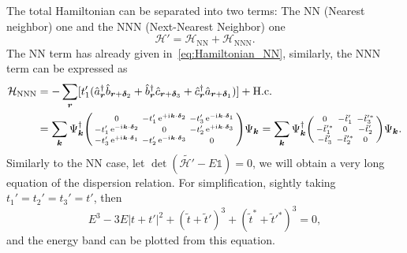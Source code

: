\documentclass[ preprint, numerical, superscriptaddress, svgnames,
                amssymb, aps, prb ]{revtex4-2}
\DeclareRobustCommand \iu {\mathrm i\mkern1mu}
\DeclareMathOperator \upe {e}
\renewcommand *\theequation{\arabic{section}.\arabic{equation}}
\begin{document}
The total Hamiltonian can be separated into two terms: The NN
(Nearest neighbor) one and the NNN (Next-Nearest Neighbor) one
\begin{equation}
  \mathcal H' = \mathcal H_\text{NN} + \mathcal H_\text{NNN}.
\end{equation}
The NN term has already given in~\eqref{eq:Hamiltonian_NN},
similarly, the NNN term can be expressed as~\cite{PhysRevB.80.113102}
\begin{equation}
\begin{aligned}
  \mathcal H_\text{NNN} & = -\sum_{\bm r}[t_1'(
    \hat a_{\bm r}^\dagger \hat b_{\bm r+\bm\delta_2}
  + \hat b_{\bm r}^\dagger \hat c_{\bm r+\bm\delta_3}
  + \hat c_{\bm r}^\dagger \hat a_{\bm r+\bm\delta_1})] + \text{H.c.}\\
& = \sum_{\bm k}
  \Psi_{\bm k}^\dagger
  \begin{psmallmatrix}
    0 & -t_1'\upe^{+\iu\bm k\cdot\bm\delta_2} &
        -t_3'\upe^{-\iu\bm k\cdot\bm\delta_1}\\
        -t_1'\upe^{-\iu\bm k\cdot\bm\delta_2} & 0 &
        -t_2'\upe^{+\iu\bm k\cdot\bm\delta_3}\\
        -t_3'\upe^{+\iu\bm k\cdot\bm\delta_1} &
        -t_2'\upe^{-\iu\bm k\cdot\bm\delta_3} & 0
  \end{psmallmatrix}
  \Psi_{\bm k}
= \sum_{\bm k}
  \Psi_{\bm k}^\dagger
  \begin{psmallmatrix}
    0 & -\tilde t_1' & -\tilde t_3'^*\\
    -\tilde t_1'^* & 0 & -\tilde t_2'\\
    -\tilde t_3' & -\tilde t_2'^* & 0
  \end{psmallmatrix}
  \Psi_{\bm k}.
\end{aligned}
\end{equation}
Similarly to the NN case, let $\det(\tilde{\mathcal H'} - E\mathds 1) = 0$,
we will obtain a very long equation of the dispersion relation.
For simplification, sightly taking $t_1' = t_2' = t_3' = t'$, then
\begin{equation}
  E^3 - 3E|t + t'|^2 + (\tilde t + \tilde t')^3
                     + (\tilde t^* + \tilde t'^*)^3 = 0,
\end{equation}
and the energy band can be plotted from this equation.
\end{document}
